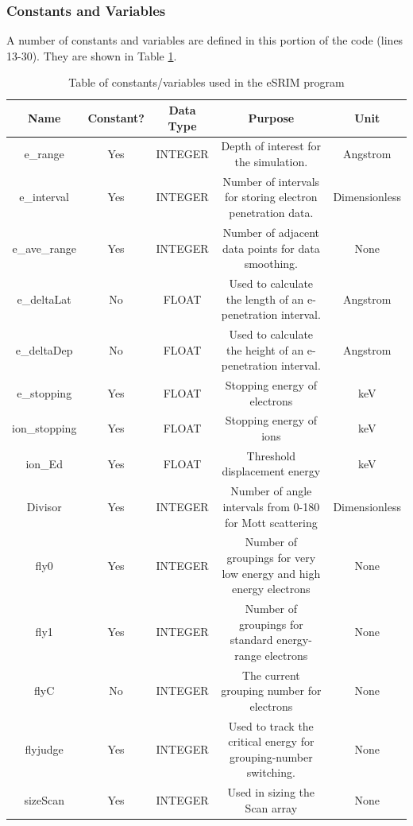 \documentclass[10pt, reqno]{exam}
\begin{document}
\subsubsection{Constants and Variables} 
A number of constants and variables are defined in this portion of the code (lines 13-30). They are shown in Table \ref{tbl:constants_and_variables}. \par
\pagebreak

{    
    \scriptsize
    \begin{longtable}{|c|c|c|c|c|}
        \caption{Table of constants/variables used in the eSRIM program}
        \label{tbl:constants_and_variables} \\
        \hline
        Name & Constant? & Data Type & Purpose & Unit \\
        \hline
        e\_range & Yes & INTEGER & Depth of interest for the simulation. & Angstrom \\
        e\_interval & Yes & INTEGER & Number of intervals for storing electron penetration data. & Dimensionless \\
        e\_ave\_range & Yes & INTEGER & Number of adjacent data points for data smoothing. & None \\
        e\_deltaLat & No & FLOAT & Used to calculate the length of an e-penetration interval. & Angstrom \\
        e\_deltaDep & No & FLOAT & Used to calculate the height of an e-penetration interval. & Angstrom \\
        e\_stopping & Yes & FLOAT & Stopping energy of electrons & keV \\
        ion\_stopping & Yes & FLOAT & Stopping energy of ions & keV \\
        ion\_Ed & Yes & FLOAT & Threshold displacement energy & keV \\
        Divisor & Yes & INTEGER & Number of angle intervals from 0-180 for Mott scattering & Dimensionless \\
        fly0 & Yes & INTEGER & Number of groupings for very low energy and high energy electrons & None \\
        fly1 & Yes & INTEGER & Number of groupings for standard energy-range electrons & None \\
        flyC & No & INTEGER & The current grouping number for electrons & None \\
        flyjudge & Yes & INTEGER & Used to track the critical energy for grouping-number switching. & None \\
        sizeScan & Yes & INTEGER & Used in sizing the Scan array & None \\

\end{longtable}}
\end{document}
